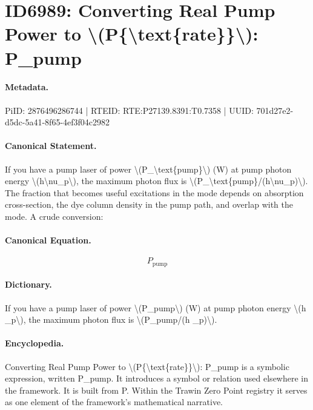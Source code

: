 \section*{ID6989: Converting Real Pump Power to \textbackslash{}(P\{\textbackslash{}text\{rate\}\}\textbackslash{}): P\_pump}
\paragraph{Metadata.}
PiID: 2876496286744 | RTEID: RTE:P27139.8391:T0.7358 | UUID: 701d27e2-d5dc-5a41-8f65-4ef3f04c2982

\paragraph{Canonical Statement.}
If you have a pump laser of power \textbackslash{}(P\_\textbackslash{}text\{pump\}\textbackslash{}) (W) at pump photon energy \textbackslash{}(h\textbackslash{}nu\_p\textbackslash{}), the maximum photon flux is \textbackslash{}(P\_\textbackslash{}text\{pump\}/(h\textbackslash{}nu\_p)\textbackslash{}). The fraction that becomes useful excitations in the mode depends on absorption cross-section, the dye column density in the pump path, and overlap with the mode. A crude conversion:

\paragraph{Canonical Equation.}
\[
P_\text{pump}
\]

\paragraph{Dictionary.}
If you have a pump laser of power \textbackslash{}(P\_pump\textbackslash{}) (W) at pump photon energy \textbackslash{}(h \_p\textbackslash{}), the maximum photon flux is \textbackslash{}(P\_pump/(h \_p)\textbackslash{}).

\paragraph{Encyclopedia.}
Converting Real Pump Power to \textbackslash{}(P\{\textbackslash{}text\{rate\}\}\textbackslash{}): P\_pump is a symbolic expression, written P\_pump. It introduces a symbol or relation used elsewhere in the framework. It is built from P. Within the Trawin Zero Point registry it serves as one element of the framework's mathematical narrative.
